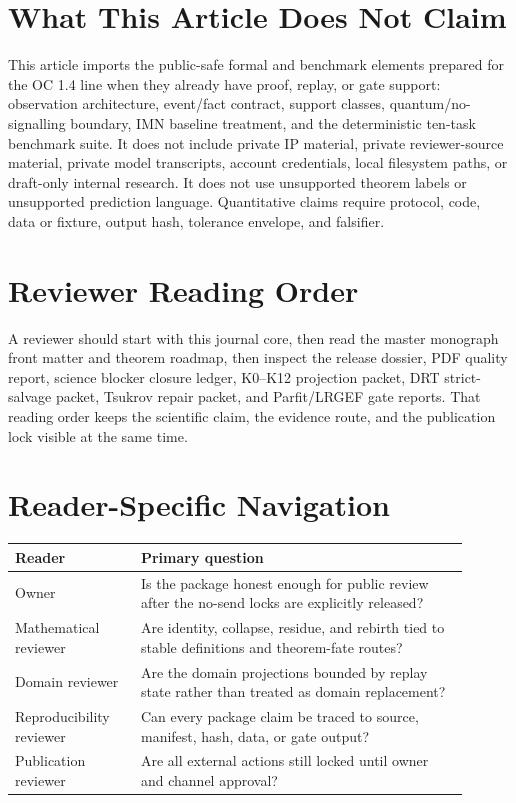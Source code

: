 \documentclass[11pt,a4paper]{article}
\begin{document}
\section*{What This Article Does Not Claim}
This article imports the public-safe formal and benchmark elements prepared for the OC 1.4 line when they already have proof, replay, or gate support: observation architecture, event/fact contract, support classes, quantum/no-signalling boundary, IMN baseline treatment, and the deterministic ten-task benchmark suite. It does not include private IP material, private reviewer-source material, private model transcripts, account credentials, local filesystem paths, or draft-only internal research. It does not use unsupported theorem labels or unsupported prediction language. Quantitative claims require protocol, code, data or fixture, output hash, tolerance envelope, and falsifier.

\section*{Reviewer Reading Order}
A reviewer should start with this journal core, then read the master monograph front matter and theorem roadmap, then inspect the release dossier, PDF quality report, science blocker closure ledger, K0--K12 projection packet, DRT strict-salvage packet, Tsukrov repair packet, and Parfit/LRGEF gate reports. That reading order keeps the scientific claim, the evidence route, and the publication lock visible at the same time.

\section*{Reader-Specific Navigation}
\begin{longtable}{>{\raggedright\arraybackslash}p{0.25\linewidth}>{\raggedright\arraybackslash}p{0.65\linewidth}}
\textbf{Reader} & \textbf{Primary question}\\
\hline
Owner & Is the package honest enough for public review after the no-send locks are explicitly released?\\
Mathematical reviewer & Are identity, collapse, residue, and rebirth tied to stable definitions and theorem-fate routes?\\
Domain reviewer & Are the domain projections bounded by replay state rather than treated as domain replacement?\\
Reproducibility reviewer & Can every package claim be traced to source, manifest, hash, data, or gate output?\\
Publication reviewer & Are all external actions still locked until owner and channel approval?\\
\end{longtable}
\end{document}
